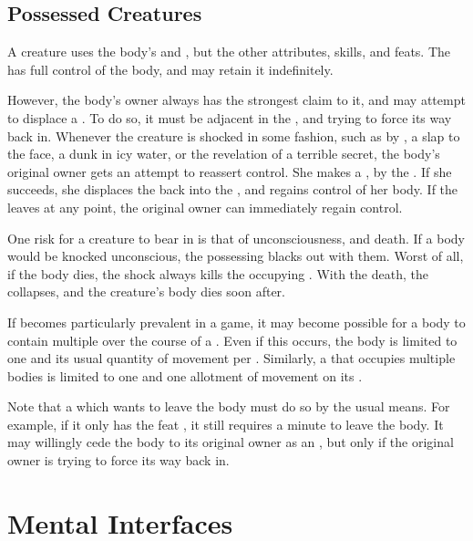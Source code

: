 \subsection{Possessed Creatures}

A {\possessed} creature uses the body's  and , but the {\possessing} {\mindpossessive} other attributes, skills, and feats.
The {\possessing} {\mind} has full control of the body, and may retain it indefinitely.

However, the body's owner always has the strongest claim to it, and may attempt to displace a {\possessing} {\mind}.
To do so, it must be adjacent in the {\mentalrealm}, and trying to force its way back in.
Whenever the {\possessing} creature is shocked in some fashion, such as by {\damage}, a slap to the face, a dunk in icy water, or the revelation of a terrible secret, the body's original owner gets an attempt to reassert control.
She makes a  {\test}, {\opposed} by the {\possessing} {\mindpossessive}  {\test}.
If she succeeds, she displaces the {\possessing} {\mind} back into the {\mentalrealm}, and regains control of her body.
If the {\possessing} {\mind} leaves at any point, the original owner can immediately regain control.

One risk for a {\possessing} creature to bear in {\mind} is that of unconsciousness, and death.
If a body would be knocked unconscious, the possessing {\mind} blacks out with them.
Worst of all, if the body dies, the shock always kills the occupying {\mind}.
With the {\mindpossessive} death, the {\lifeline} collapses, and the {\possessing} creature's body dies soon after.

If {\possession} becomes particularly prevalent in a game, it may become possible for a body to contain multiple {\minds} over the course of a {\round}.
Even if this occurs, the body is limited to one {\action} and its usual quantity of movement per {\round}.
Similarly, a {\mind} that occupies multiple bodies is limited to one {\action} and one allotment of movement on its {\turn}.

Note that a {\possessing} {\mind} which wants to leave the body must do so by the usual means.
For example, if it only has the feat , it still requires a minute to leave the body.
It may willingly cede the body to its original owner as an {\action}, but only if the original owner is trying to force its way back in.

\section{Mental Interfaces}

